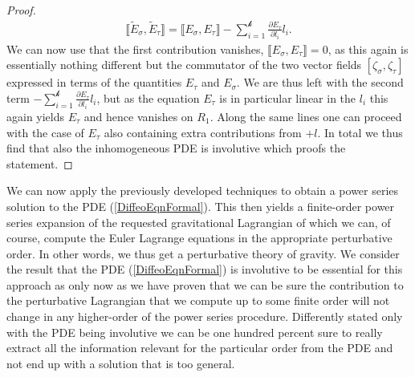 \begin{proof}
\begin{align}
    \llbracket \tilde{E}_{\sigma}, \tilde{E}_{\tau} \rrbracket = \llbracket E_{\sigma}, E_{\tau} \rrbracket - \sum_{i=1}^{\mathcal{k}} \frac{\partial E_{\tau}}{\partial l_i} l_i.
\end{align}
We can now use that the first contribution vanishes, $\llbracket E_{\sigma}, E_{\tau} \rrbracket = 0$, as this again is essentially nothing different but the commutator of the two vector fields $[\zeta_{\sigma},\zeta_{\tau}]$ expressed in terms of the quantities $E_{\tau}$ and $E_{\sigma}$. We are thus left with the second term $- \sum_{i=1}^{\mathcal{k}} \frac{\partial E_{\tau}}{\partial l_i} l_i$, but as the equation $E_{\tau}$ is in particular linear in the $l_i$ this again yields $E_{\tau}$ and hence vanishes on $R_1$. Along the same lines one can proceed with the case of $E_{\tau}$ also containing extra contributions from $+l$. In total we thus find that also the inhomogeneous PDE is involutive which proofs the statement.
\end{proof}

We can now apply the previously developed techniques to obtain a power series solution to the PDE (\ref{DiffeoEqnFormal}). This then yields a finite-order power series expansion of the requested gravitational Lagrangian of which we can, of course, compute the Euler Lagrange equations in the appropriate perturbative order. In other words, we thus get a perturbative theory of gravity. We consider the result that the PDE (\ref{DiffeoEqnFormal}) is involutive to be essential for this approach as only now as we have proven that we can be sure the contribution to the perturbative Lagrangian that we compute up to some finite order will not change in any higher-order of the power series procedure. Differently stated only with the PDE being involutive we can be one hundred percent sure to really extract all the information relevant for the particular order from the PDE and not end up with a solution that is too general. 

